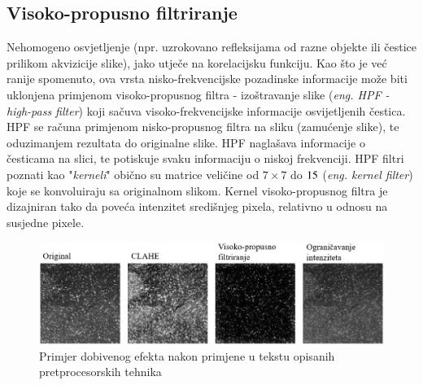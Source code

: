 \subsection{Visoko-propusno filtriranje}
Nehomogeno osvjetljenje (npr. uzrokovano refleksijama od razne objekte ili čestice prilikom akvizicije slike), jako utječe na korelacijsku funkciju. Kao što je već ranije spomenuto, ova vrsta nisko-frekvencijske pozadinske informacije može biti uklonjena primjenom visoko-propusnog filtra - izoštravanje slike (\textit{eng. HPF - high-pass filter}) koji sačuva visoko-frekvencijske informacije osvijetljenih čestica. HPF se računa primjenom nisko-propusnog filtra na sliku (zamućenje slike), te oduzimanjem rezultata do originalne slike. HPF naglašava informacije o česticama na slici, te potiskuje svaku informaciju o niskoj frekvenciji. HPF filtri poznati kao "\textit{kerneli}" obično su matrice veličine od $7 \times 7$ do $15 \time 15$ (\textit{eng. kernel filter}) koje se konvoluiraju sa originalnom slikom. Kernel visoko-propusnog filtra je dizajniran tako da poveća intenzitet središnjeg pixela, relativno u odnosu na susjedne pixele.
\begin{figure}[h]  
	\centering
	\includegraphics[width=16.5cm]{./2_DPIV/2_5IzostravnjeSlike.jpg} 
	\caption{Primjer dobivenog efekta nakon primjene u tekstu opisanih pretprocesorskih tehnika \cite{thielicke2014_article}}
	\label{sl:2.5}
\end{figure}
\FloatBarrier
